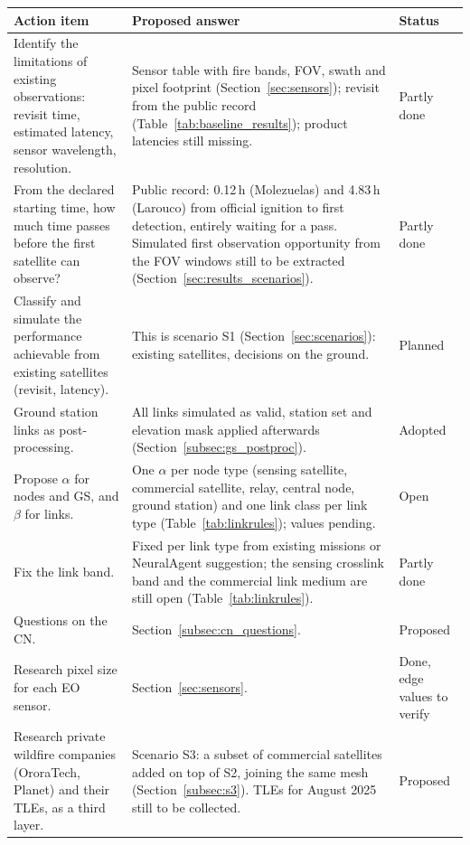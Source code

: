 \documentclass[11pt]{article}
\begin{document}
\begin{longtable}{p{5.2cm}p{7.2cm}p{2.2cm}}
\toprule
\textbf{Action item} & \textbf{Proposed answer} & \textbf{Status} \\
\midrule
\endhead
Identify the limitations of existing observations: revisit time, estimated latency, sensor wavelength, resolution. & Sensor table with fire bands, FOV, swath and pixel footprint (Section~\ref{sec:sensors}); revisit from the public record (Table~\ref{tab:baseline_results}); product latencies still missing. & Partly done \\
From the declared starting time, how much time passes before the first satellite can observe? & Public record: 0.12\,h (Molezuelas) and 4.83\,h (Larouco) from official ignition to first detection, entirely waiting for a pass. Simulated first observation opportunity from the FOV windows still to be extracted (Section~\ref{sec:results_scenarios}). & Partly done \\
Classify and simulate the performance achievable from existing satellites (revisit, latency). & This is scenario S1 (Section~\ref{sec:scenarios}): existing satellites, decisions on the ground. & Planned \\
Ground station links as post-processing. & All links simulated as valid, station set and elevation mask applied afterwards (Section~\ref{subsec:gs_postproc}). & Adopted \\
Propose $\alpha$ for nodes and GS, and $\beta$ for links. & One $\alpha$ per node type (sensing satellite, commercial satellite, relay, central node, ground station) and one link class per link type (Table~\ref{tab:linkrules}); values pending. & Open \\
Fix the link band. & Fixed per link type from existing missions or NeuralAgent suggestion; the sensing crosslink band and the commercial link medium are still open (Table~\ref{tab:linkrules}). & Partly done \\
Questions on the CN. & Section~\ref{subsec:cn_questions}. & Proposed \\
Research pixel size for each EO sensor. & Section~\ref{sec:sensors}. & Done, edge values to verify \\
Research private wildfire companies (OroraTech, Planet) and their TLEs, as a third layer. & Scenario S3: a subset of commercial satellites added on top of S2, joining the same mesh (Section~\ref{subsec:s3}). TLEs for August 2025 still to be collected. & Proposed \\
\bottomrule
\end{longtable}
\end{document}
